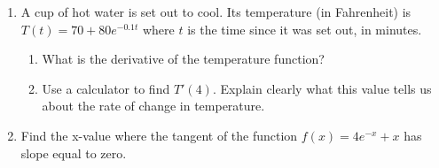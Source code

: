 \documentclass[10pt]{article}
\newcommand{\ds}{\displaystyle}
\begin{document}
\newpage

\noindent
\begin{enumerate}
\setcounter{enumi}{\theenumCount}



\item A cup of hot water is set out to cool.  Its temperature (in Fahrenheit) is $T(t) = 70 + 80 e^{-0.1t}$ where $t$ is the time since it was set out, in minutes. 

\begin{enumerate}
\item  What is the derivative of the temperature function?
\vfill 

\item Use a calculator to find $T'(4)$. Explain clearly what this value tells us about the rate of change in temperature. 
\vfill
\end{enumerate}

\item Find the x-value where the tangent of the function $f(x) = 4 e^{-x}+x$ has slope equal to zero.
\begin{flushright}
\end{flushright}
\vfill
\vfill
\vfill



\setcounter{enumCount}{\theenumi}
\end{enumerate}
\end{document}
